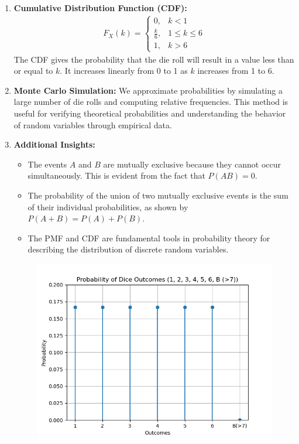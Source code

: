 \documentclass[journal]{IEEEtran}
\begin{document}
\begin{enumerate}
\item \textbf{Cumulative Distribution Function (CDF):}
\begin{align}
    F_X(k) = \begin{cases}
        0, & k < 1 \\
        \frac{k}{6}, & 1 \leq k \leq 6 \\
        1, & k > 6
    \end{cases}
\end{align}
The CDF gives the probability that the die roll will result in a value less than or equal to \( k \). It increases linearly from 0 to 1 as \( k \) increases from 1 to 6.

\item \textbf{Monte Carlo Simulation:}
We approximate probabilities by simulating a large number of die rolls and computing relative frequencies. This method is useful for verifying theoretical probabilities and understanding the behavior of random variables through empirical data.

\item \textbf{Additional Insights:}
\begin{itemize}
    \item The events \( A \) and \( B \) are mutually exclusive because they cannot occur simultaneously. This is evident from the fact that \( P(AB) = 0 \).
    \item The probability of the union of two mutually exclusive events is the sum of their individual probabilities, as shown by \( P(A + B) = P(A) + P(B) \).
    \item The PMF and CDF are fundamental tools in probability theory for describing the distribution of discrete random variables.
\end{itemize}
\begin{figure}[H]
    \centering
    \includegraphics[width=\columnwidth]{figs/fig.png}
    
    \label{fig:pmf}
\end{figure}

\end{enumerate}
\end{document}
